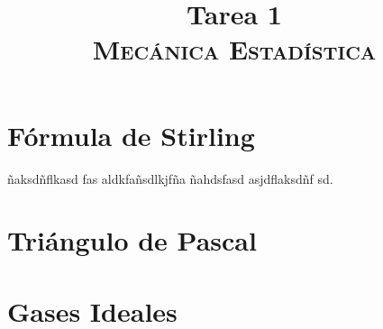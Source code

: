 \documentclass[conference]{IEEEtran}
\begin{document}
\title{Tarea 1 \\
{\footnotesize \scshape{Mecánica Estadística}}
}

\author{
}



\maketitle

%


\section{Fórmula de Stirling}
ñaksdñflkasd fas aldkfañsdlkjfña \citep{einstein} ñahdsfasd \citep{latexcompanion} asjdflaksdñf sd.
\section{Triángulo de Pascal}

\section{Gases Ideales}


 

\end{document}
